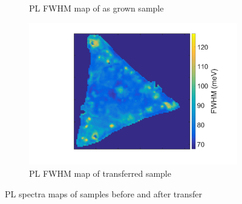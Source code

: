 \begin{figure}[ht]
\begin{center}
\begin{subfigure}[b]{0.4\textwidth}
			\caption{PL FWHM map of as grown sample}
			\label{fig:TransferPLWidthMapAsgrown}
		\end{subfigure}
		\quad
		\begin{subfigure}[b]{0.4\textwidth}
			\includegraphics[scale=0.15]{Transfer/TransferPLWidthMapTransferred.png}
			\caption{PL FWHM map of transferred sample}
		\label{fig:TransferPLWidthMapTransferred}
		\end{subfigure}
		\caption{PL spectra maps of samples before and after transfer}
		\label{fig:TransferPLMapsComparison}
	\end{center}
\end{figure}
	
